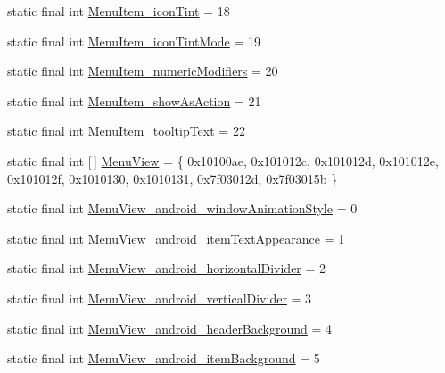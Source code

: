 \begin{DoxyCompactItemize}
static final int \mbox{\hyperlink{classandroid_1_1support_1_1design_1_1_r_1_1styleable_a4ff69a8941296f4691e40a4227e39004}{Menu\+Item\+\_\+icon\+Tint}} = 18
\item 
static final int \mbox{\hyperlink{classandroid_1_1support_1_1design_1_1_r_1_1styleable_a2d72b2124b229a3477bfc2097bced1e2}{Menu\+Item\+\_\+icon\+Tint\+Mode}} = 19
\item 
static final int \mbox{\hyperlink{classandroid_1_1support_1_1design_1_1_r_1_1styleable_adc5e7f177e1243ae380bdb71d967162e}{Menu\+Item\+\_\+numeric\+Modifiers}} = 20
\item 
static final int \mbox{\hyperlink{classandroid_1_1support_1_1design_1_1_r_1_1styleable_a9228bf5ad0fd30f0f56bd75d963d21c7}{Menu\+Item\+\_\+show\+As\+Action}} = 21
\item 
static final int \mbox{\hyperlink{classandroid_1_1support_1_1design_1_1_r_1_1styleable_ac0c3633e22b8cec6f62c2a53df003f2f}{Menu\+Item\+\_\+tooltip\+Text}} = 22
\item 
static final int \mbox{[}$\,$\mbox{]} \mbox{\hyperlink{classandroid_1_1support_1_1design_1_1_r_1_1styleable_acaf80b4eb554eab1b6f3b7f929ac7039}{Menu\+View}} = \{ 0x10100ae, 0x101012c, 0x101012d, 0x101012e, 0x101012f, 0x1010130, 0x1010131, 0x7f03012d, 0x7f03015b \}
\item 
static final int \mbox{\hyperlink{classandroid_1_1support_1_1design_1_1_r_1_1styleable_a34456b5445aaf302afb7e7acb7887c20}{Menu\+View\+\_\+android\+\_\+window\+Animation\+Style}} = 0
\item 
static final int \mbox{\hyperlink{classandroid_1_1support_1_1design_1_1_r_1_1styleable_a7a53c46d2afe09a8f3a1ba5c28c757f7}{Menu\+View\+\_\+android\+\_\+item\+Text\+Appearance}} = 1
\item 
static final int \mbox{\hyperlink{classandroid_1_1support_1_1design_1_1_r_1_1styleable_a479d3dd424d384893ed17a0c1d15c413}{Menu\+View\+\_\+android\+\_\+horizontal\+Divider}} = 2
\item 
static final int \mbox{\hyperlink{classandroid_1_1support_1_1design_1_1_r_1_1styleable_a08c33b701e90e1157d2bb6ff33d34134}{Menu\+View\+\_\+android\+\_\+vertical\+Divider}} = 3
\item 
static final int \mbox{\hyperlink{classandroid_1_1support_1_1design_1_1_r_1_1styleable_a6b1adf92334f4d846399c03132c5ea81}{Menu\+View\+\_\+android\+\_\+header\+Background}} = 4
\item 
static final int \mbox{\hyperlink{classandroid_1_1support_1_1design_1_1_r_1_1styleable_a5db21fb17308a868d9c88a641e23e10f}{Menu\+View\+\_\+android\+\_\+item\+Background}} = 5

\end{DoxyCompactItemize}
